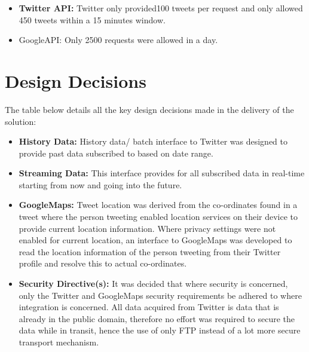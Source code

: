 \documentclass[12pt]{article} %
\begin{document}
\begin{itemize}
	\item \textbf{Twitter API:} Twitter only provided100 tweets per request and only allowed 450 tweets within a 15 minutes window.
	\item GoogleAPI: Only 2500 requests were allowed in a day.
\end{itemize}

	
	\section {Design Decisions}
	
	The table below details all the key design decisions made in the delivery of the solution:
	
\begin{itemize} 
	\item \textbf{History Data:} History data/ batch interface to Twitter was designed to provide past data subscribed to based on date range.
	
	\item \textbf{Streaming Data:} 
	This interface provides for all subscribed data in real-time starting from now and going into the future.
	
	\item \textbf{GoogleMaps:} 
	Tweet location was derived from the co-ordinates found in a tweet where the person tweeting enabled location services on their device to provide current location information. Where privacy settings were not enabled for current location, an interface to GoogleMaps was developed to read the location information of the person tweeting from their Twitter profile and resolve this to actual co-ordinates.
	
	\item \textbf{Security Directive(s):} 
	It was decided that where security is concerned, only the Twitter and GoogleMaps security requirements be adhered to where integration is concerned. All data acquired from Twitter is data that is already in the public domain, therefore no effort was required to secure the data while in transit, hence the use of only FTP instead of a lot more secure transport mechanism.
\end{itemize}
	
	
	
\end{document}
